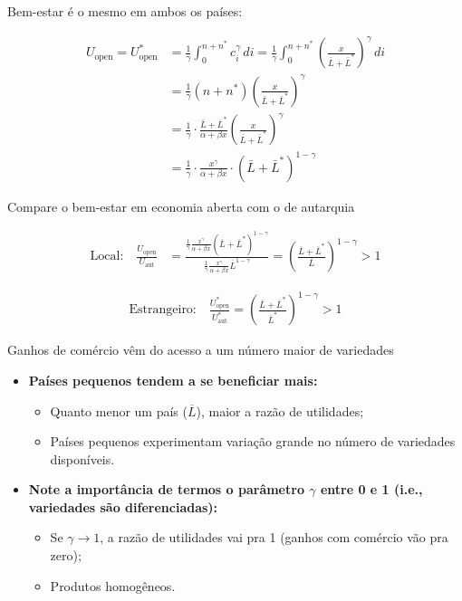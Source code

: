 \documentclass[a4paper,12pt]{article}[abntex2]
\begin{document}
Bem-estar é o mesmo em ambos os países:

\begin{align*}
U_{\text{open}} = U^*_{\text{open}} 
&= \frac{1}{\gamma} \int_0^{n+n^*} c_i^\gamma \, di 
= \frac{1}{\gamma} \int_0^{n+n^*} \left( \frac{x}{\bar{L} + \bar{L}^*} \right)^\gamma \, di \\
&= \frac{1}{\gamma} (n + n^*) \left( \frac{x}{\bar{L} + \bar{L}^*} \right)^\gamma \\
&= \frac{1}{\gamma} \cdot \frac{\bar{L} + \bar{L}^*}{\alpha + \beta x} \left( \frac{x}{\bar{L} + \bar{L}^*} \right)^\gamma \\
&= \frac{1}{\gamma} \cdot \frac{x^\gamma}{\alpha + \beta x} \cdot (\bar{L} + \bar{L}^*)^{1 - \gamma}
\end{align*}


Compare o bem-estar em economia aberta com o de autarquia

\begin{align*}
\text{Local:} \quad 
\frac{U_{\text{open}}}{U_{\text{aut}}} 
&= \frac{\displaystyle \frac{1}{\gamma} \frac{x^\gamma}{\alpha + \beta x} (\overline{L} + \overline{L}^*)^{1-\gamma}}{\displaystyle \frac{1}{\gamma} \frac{x^\gamma}{\alpha + \beta x} \overline{L}^{1-\gamma}} 
= \left( \frac{\overline{L} + \overline{L}^*}{\overline{L}} \right)^{1 - \gamma} > 1
\end{align*}

\begin{align*}
\text{Estrangeiro:} \quad 
\frac{U^*_{\text{open}}}{U^*_{\text{aut}}} 
= \left( \frac{\overline{L} + \overline{L}^*}{\overline{L}^*} \right)^{1 - \gamma} > 1
\end{align*}

Ganhos de comércio vêm do acesso a um número maior de variedades

\begin{itemize}
  \item \textbf{Países pequenos tendem a se beneficiar mais:}
  \begin{itemize}
    \item Quanto menor um país ($\overline{L}$), maior a razão de utilidades;
    \item Países pequenos experimentam variação grande no número de variedades disponíveis.
  \end{itemize}

  \item \textbf{Note a importância de termos o parâmetro $\gamma$ entre 0 e 1 (i.e., variedades são diferenciadas):}
  \begin{itemize}
    \item Se $\gamma \to 1$, a razão de utilidades vai pra 1 (ganhos com comércio vão pra zero);
    \item Produtos homogêneos.
  \end{itemize}
\end{itemize}
\end{document}
